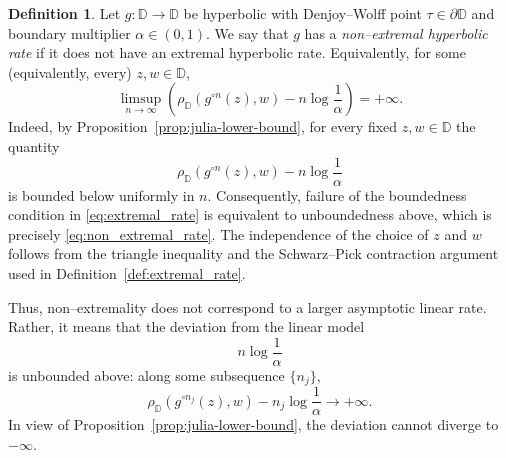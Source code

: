 \documentclass[12pt]{amsart}
\numberwithin{equation}{section}
\theoremstyle{plain}
\theoremstyle{definition}
\newtheorem{definition}[equation]{Definition}
\begin{document}
\begin{definition}
\label{def:non-extremal_rate}
Let $g:\mathbb{D}\to\mathbb{D}$ be hyperbolic with Denjoy--Wolff point
$\tau\in\partial\mathbb{D}$ and boundary multiplier
$\alpha\in(0,1)$. We say that $g$ has a
\emph{non--extremal hyperbolic rate} if it does not have an extremal
hyperbolic rate. Equivalently, for some (equivalently, every)
$z,w\in\mathbb{D}$,
\begin{equation*}
\label{eq:non_extremal_rate}
\limsup_{n\to\infty}
\left(
\rho_{\mathbb{D}}(g^{\circ n}(z),w)
-
n\log\frac{1}{\alpha}
\right)
=
+\infty.
\end{equation*}
Indeed, by Proposition~\ref{prop:julia-lower-bound}, for every fixed
$z,w\in\mathbb{D}$ the quantity
\begin{equation*}
\rho_{\mathbb{D}}(g^{\circ n}(z),w)
-
n\log\frac{1}{\alpha}
\end{equation*}
is bounded below uniformly in $n$. Consequently, failure of the
boundedness condition in \eqref{eq:extremal_rate} is equivalent to
unboundedness above, which is precisely \eqref{eq:non_extremal_rate}.
The independence of the choice of $z$ and $w$ follows from the
triangle inequality and the Schwarz--Pick contraction argument used
in Definition~\ref{def:extremal_rate}.

Thus, non--extremality does not correspond to a larger asymptotic
linear rate. Rather, it means that the deviation from the linear
model
\begin{equation*}
n\log\frac{1}{\alpha}
\end{equation*}
is unbounded above: along some subsequence $\{n_j\}$,
\begin{equation*}
\rho_{\mathbb{D}}(g^{\circ n_j}(z),w)
-
n_j\log\frac{1}{\alpha}
\longrightarrow+\infty.
\end{equation*}
In view of Proposition~\ref{prop:julia-lower-bound}, the deviation
cannot diverge to $-\infty$.
\end{definition}
\end{document}
